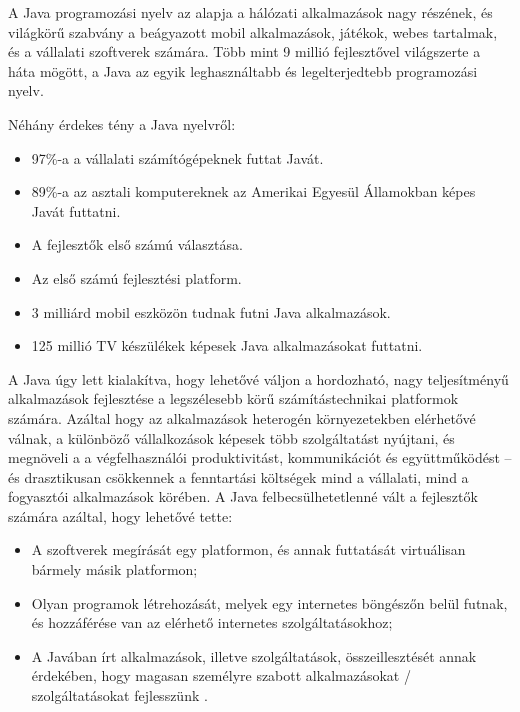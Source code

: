 \documentclass[a4paper,12pt]{report}
\begin{document}
A Java programozási nyelv az alapja a hálózati alkalmazások nagy részének, és világkörű szabvány a beágyazott mobil alkalmazások, játékok, webes tartalmak, és a vállalati szoftverek számára. Több mint 9 millió fejlesztővel világszerte a háta mögött, a Java az egyik leghasználtabb és legelterjedtebb programozási nyelv. 

\vspace{2mm}
Néhány érdekes tény a Java nyelvről:

\begin{itemize}
\item 97\%-a a vállalati számítógépeknek futtat Javát.
\item 89\%-a az asztali komputereknek az Amerikai Egyesül Államokban képes Javát futtatni.
\item A fejlesztők első számú választása.
\item Az első számú fejlesztési platform.
\item 3 milliárd mobil eszközön tudnak futni Java alkalmazások.
\item 125 millió TV készülékek képesek Java alkalmazásokat futtatni.
\end{itemize}

\vspace{2mm}
A Java úgy lett kialakítva, hogy lehetővé váljon a hordozható, nagy teljesítményű alkalmazások fejlesztése a legszélesebb körű számítástechnikai platformok számára. Azáltal hogy az alkalmazások heterogén környezetekben elérhetővé válnak, a különböző vállalkozások képesek több szolgáltatást nyújtani, és megnöveli a a végfelhasználói produktivitást, kommunikációt és együttműködést -- és drasztikusan csökkennek a fenntartási költségek mind a vállalati, mind a fogyasztói alkalmazások körében. A Java felbecsülhetetlenné vált a fejlesztők számára azáltal, hogy lehetővé tette:

\begin{itemize}
\item A szoftverek megírását egy platformon, és annak futtatását virtuálisan bármely másik platformon;
\item Olyan programok létrehozását, melyek egy internetes böngészőn belül futnak, és hozzáférése van az elérhető internetes szolgáltatásokhoz;
\item A Javában írt alkalmazások, illetve szolgáltatások, összeillesztését annak érdekében, hogy magasan személyre szabott alkalmazásokat / szolgáltatásokat fejlesszünk \cite{aboutjava}.
\end{itemize}
\end{document}
